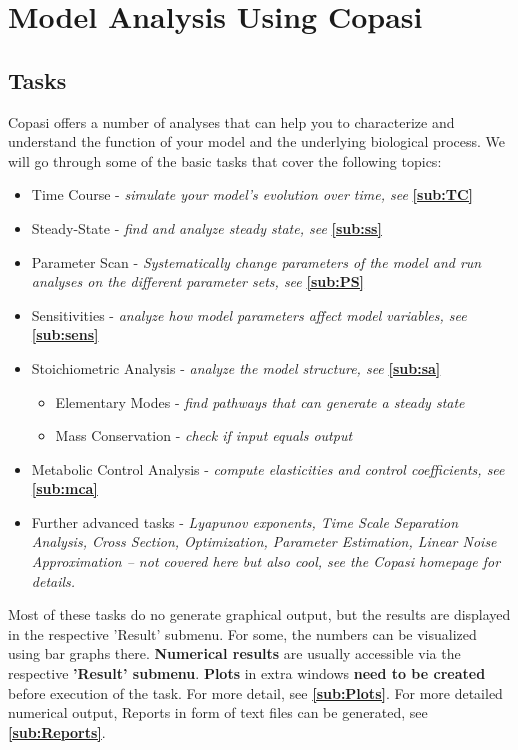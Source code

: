 \documentclass[a4paper,11pt,twoside]{article}
\begin{document}
\newpage
\section{Model Analysis Using Copasi}
\subsection{Tasks}
\label{sub:Tasks}
Copasi offers a number of analyses that can help you to characterize and understand the function of your model and the underlying biological process. We will go through some of the basic tasks that cover the following topics:
\begin{itemize}
\item Time Course -  \textit{simulate your model's evolution over time, see }\textbf{\ref{sub:TC}} 
\item  Steady-State -  \textit{find and  analyze  steady state, see }\textbf{\ref{sub:ss}}
\item Parameter Scan  -  \textit{Systematically change parameters of the model and run analyses on the different parameter sets, see }\textbf{\ref{sub:PS}}
\item Sensitivities - \textit{analyze how model parameters affect  model variables, see }\textbf{\ref{sub:sens}}
\item Stoichiometric Analysis - \textit{analyze the model structure,  see }\textbf{\ref{sub:sa}}
 \begin{itemize}
 \item Elementary Modes - \textit{find pathways that can generate a steady state}
 \item Mass Conservation - \textit{check if input equals output}
 \end{itemize}
\item Metabolic Control Analysis - \textit{compute elasticities and  control coefficients, see }\textbf{\ref{sub:mca}}
\item Further advanced tasks - \textit{Lyapunov exponents, Time Scale Separation Analysis, Cross Section, Optimization, Parameter Estimation, Linear Noise Approximation -- not covered here but also cool, see the Copasi homepage for details.}
\end{itemize}

Most of these tasks do no generate graphical output, but the results are displayed in the respective 'Result' submenu.  For some, the numbers can be visualized using bar graphs there.
\textbf{Numerical results} are usually accessible via the respective \textbf{'Result' submenu}.  \textbf{Plots} in extra windows\textbf{ need to be created} before execution of the task. For more detail, see \textbf{\ref{sub:Plots}}. For more detailed numerical output, Reports in form of text files can be generated, see \textbf{\ref{sub:Reports}}.
\end{document}
